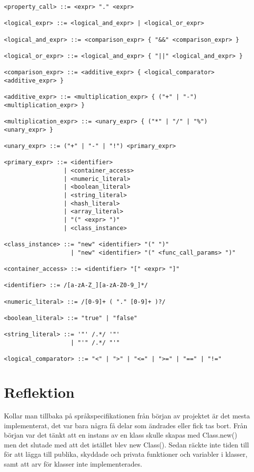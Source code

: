 \documentclass{TDP003mall}
\begin{document}
\begin{verbatim}
<property_call> ::= <expr> "." <expr>

<logical_expr> ::= <logical_and_expr> | <logical_or_expr>

<logical_and_expr> ::= <comparison_expr> { "&&" <comparison_expr> }

<logical_or_expr> ::= <logical_and_expr> { "||" <logical_and_expr> }

<comparison_expr> ::= <additive_expr> { <logical_comparator> <additive_expr> }

<additive_expr> ::= <multiplication_expr> { ("+" | "-") <multiplication_expr> }

<multiplication_expr> ::= <unary_expr> { ("*" | "/" | "%") <unary_expr> }

<unary_expr> ::= ("+" | "-" | "!") <primary_expr>

<primary_expr> ::= <identifier> 
                 | <container_access>
                 | <numeric_literal> 
                 | <boolean_literal>
                 | <string_literal>
                 | <hash_literal>
                 | <array_literal>
                 | "(" <expr> ")"
                 | <class_instance>

<class_instance> ::= "new" <identifier> "(" ")"
                   | "new" <identifier> "(" <func_call_params> ")"

<container_access> ::= <identifier> "[" <expr> "]"

<identifier> ::= /[a-zA-Z_][a-zA-Z0-9_]*/

<numeric_literal> ::= /[0-9]+ ( "." [0-9]+ )?/

<boolean_literal> ::= "true" | "false"

<string_literal> ::= '"' /.*/ '"'
                   | "'" /.*/ "'"

<logical_comparator> ::= "<" | ">" | "<=" | ">=" | "==" | "!="
\end{verbatim}

\section{Reflektion}
Kollar man tillbaka på språkspecifikationen från början av projektet är det mesta implementerat, det var bara några få delar som ändrades eller fick tas bort.
Från början var det tänkt att en instans av en klass skulle skapas med Class.new() men det slutade med att det istället blev new Class(). Sedan räckte inte tiden till för att lägga till publika, skyddade och privata funktioner och variabler i klasser, samt att arv för klasser inte implementerades.
\end{document}
